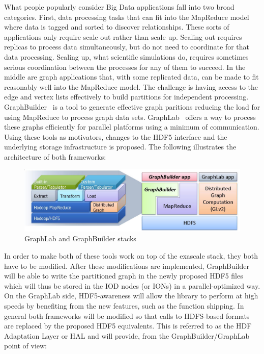 \documentclass[conference]{IEEEtran}
\begin{document}
What people popularly consider Big Data applications fall into two broad
categories. First, data processing tasks that can fit into the MapReduce model
where data is tagged and sorted to discover relationships. These sorts of
applications only require scale out rather than scale up. Scaling out requires
replicas to process data simultaneously, but do not need to coordinate for that
data processing. Scaling up, what scientific simulations do, requires sometimes
serious coordination between the processes for any of them to succeed. In the
middle are graph applications that, with some replicated data, can be made to
fit reasonably well into the MapReduce model. The challenge is having access to
the edge and vertex lists effectively to build partitions for independent
processing. GraphBuilder~\cite{Jain:2013:GraphBuilder} is a tool to generate
effective graph paritions reducing the load for using MapReduce to process
graph data sets. GraphLab~\cite{Low:2012:GraphLab} offers a way to process
these graphs efficiently for parallel platforms using a minimum of
communication. Using these tools as motivators, changes to the HDF5 interface
and the underlying storage infrastructure is proposed.  The following
illustrates the architecture of both frameworks:

\begin{figure}[htbp]
\centering
\vspace{-0.10in}
\includegraphics[width=\columnwidth]{images/graphlab-and-graphbuilder.png}
\vspace{-0.30in}
\caption{GraphLab and GraphBuilder stacks}
\label{fig:graphlab-graphbuilder}
\vspace{-0.10in}
\end{figure}

In order to make both of these tools work on top of the exascale stack, they
both have to be modified. After these modifications are implemented,
GraphBuilder will be able to write the partitioned graph in the newly proposed
HDF5 files which will thus be stored in the IOD nodes (or IONs) in a
parallel-optimized way. On the GraphLab side, HDF5-awareness will allow
the library to perform at high speeds by benefiting from the new
features, such as the function shipping. In general both frameworks will be
modified so that calls to HDFS-based formats are replaced by the proposed HDF5
equivalents. This is referred to as the HDF Adaptation Layer or HAL and will
provide, from the GraphBuilder/GraphLab point of view:
\end{document}
